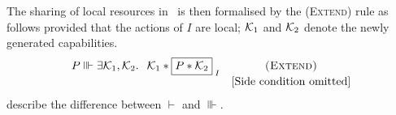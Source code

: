 The sharing of local resources in \colosl\ is then formalised by the \textsc{(Extend)} rule as follows provided that the actions of $I$ are local; $\mathcal{K}_{1}$ and $\mathcal{K}_{2}$ denote the newly generated capabilities.
%
\[
\begin{array}{l c}
	P \sentails \exsts{\capAss{1}, \capAss{2}}\;\; \capAss{1} * \shared{P * \capAss{2}}{I} & \textsc{(Extend)}\\
	& \text{[Side condition omitted]}
\end{array}
\]
%
\todo describe the difference between $\vdash$ and $\Vvdash$.\\
%

